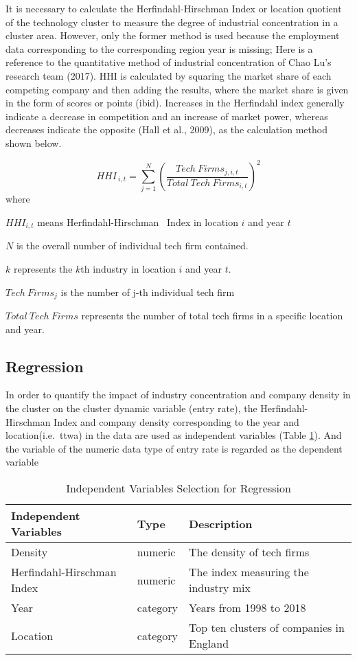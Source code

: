 \documentclass[
  12pt,
  oneside]{book}
\begin{document}
It is necessary to calculate the Herfindahl-Hirschman Index or location quotient of the technology cluster to measure the degree of industrial concentration in a cluster area. However, only the former method is used because the employment data corresponding to the corresponding region year is missing; Here is a reference to the quantitative method of industrial concentration of Chao Lu's research team (2017). HHI is calculated by squaring the market share of each competing company and then adding the results, where the market share is given in the form of scores or points (ibid). Increases in the Herfindahl index generally indicate a decrease in competition and an increase of market power, whereas decreases indicate the opposite (Hall et al., 2009), as the calculation method shown below.

\[
HHI_{\ i,t} = \sum_{j=1}^N (\frac{Tech\ Firms_{j,i,t}}{Total\ Tech\ Firms_{i,t}})^2 
\]
where

\(HHI_{i,t}\) means Herfindahl-Hirschman ~Index in location \(i\) and year \(t\)

\(N\) is the overall number of individual tech firm contained.

\(k\) represents the \(k\)th industry in location \(i\) and year \(t\).

\(Tech\ Firms_j\) is the number of j-th individual tech firm

\(Total\ Tech\ Firms\) represents the number of total tech firms in a specific location and year.

\hypertarget{regression}{%
\subsection{Regression}\label{regression}}

In order to quantify the impact of industry concentration and company density in the cluster on the cluster dynamic variable (entry rate), the Herfindahl-Hirschman Index and company density corresponding to the year and location(i.e.~ttwa) in the data are used as independent variables (Table \ref{tab:tab-reg-idp-var}). And the variable of the numeric data type of entry rate is regarded as the dependent variable

\begin{table}

\caption{\label{tab:tab-reg-idp-var}Independent Variables Selection for Regression}
\centering
\begin{tabular}[t]{lll}
\toprule
\textbf{Independent Variables} & \textbf{Type} & \textbf{Description}\\
\midrule
Density & numeric & The density of tech firms\\
Herfindahl-Hirschman Index & numeric & The index measuring the industry mix\\
Year & category & Years from 1998 to 2018\\
Location & category & Top ten clusters of companies in England\\
\bottomrule
\end{tabular}
\end{table}
\end{document}
